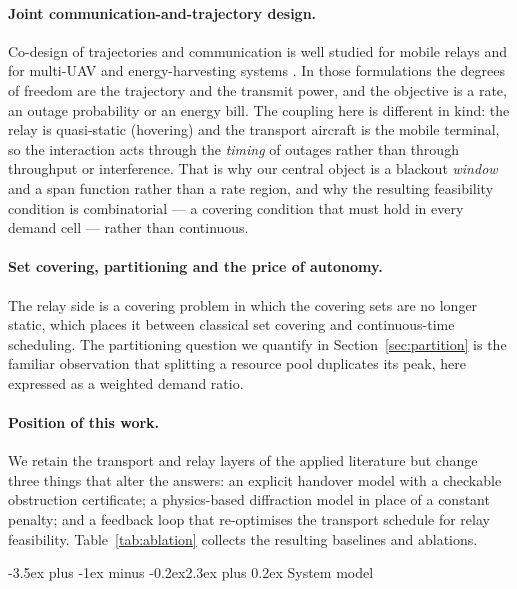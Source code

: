 \documentclass[11pt]{article}
\makeatletter
\def\section{\@startsection{section}{1}{\z@}%
    {1.0\baselineskip plus 0.25\baselineskip minus 0.25\baselineskip}%
    {0.4\baselineskip}%
    {\normalfont\normalsize\centering\bfseries}}%
\renewcommand{\section}{\@startsection{section}{1}{\z@}%
      {-3.5ex plus -1ex minus -0.2ex}{2.3ex plus 0.2ex}%
      {\normalfont\Large\bfseries}}%
\renewcommand{\section}{\@startsection{section}{1}{\z@}%
      {-3.5ex plus -1ex minus -0.2ex}{2.3ex plus 0.2ex}%
      {\normalfont\large\bfseries}}%
\theoremstyle{dshplain}
\theoremstyle{dshdefn}
\makeatother
\begin{document}
\paragraph{Joint communication-and-trajectory design.}
Co-design of trajectories and communication is well studied for mobile relays
\cite{zeng2016relay,relay5g} and for multi-UAV and energy-harvesting systems
\cite{wu2018,you2019,xu2018wpt,zengtraj,mozaffari}. In those formulations the
degrees of freedom are the trajectory and the transmit power, and the objective is
a rate, an outage probability or an energy bill. The coupling here is different in
kind: the relay is quasi-static (hovering) and the transport aircraft is the
mobile terminal, so the interaction acts through the \emph{timing} of outages
rather than through throughput or interference. That is why our central object is
a blackout \emph{window} and a span function rather than a rate region, and why
the resulting feasibility condition is combinatorial --- a covering condition that
must hold in every demand cell --- rather than continuous.

\paragraph{Set covering, partitioning and the price of autonomy.}
The relay side is a covering problem in which the covering sets are no longer
static, which places it between classical set covering \cite{korte} and
continuous-time scheduling. The partitioning question we quantify in
Section~\ref{sec:partition} is the familiar observation that splitting a
resource pool duplicates its peak, here expressed as a weighted
demand ratio.

\paragraph{Position of this work.}
We retain the transport and relay layers of the applied literature but change
three things that alter the answers: an explicit handover model with a
checkable obstruction certificate; a physics-based diffraction model in place
of a constant penalty; and a feedback loop that re-optimises the transport
schedule for relay feasibility. Table~\ref{tab:ablation} collects the resulting
baselines and ablations.

\section{System model}
\label{sec:model}
\end{document}
